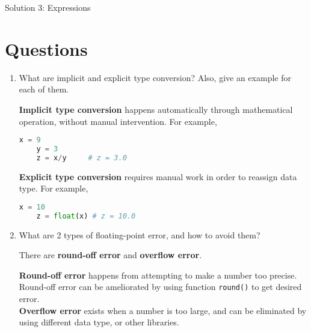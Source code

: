 \documentclass[11pt]{article}
\begin{document}
\begin{center}
    \Large{Solution 3: Expressions}
\end{center}

\section*{Questions}

\begin{enumerate}
    \item {
        What are implicit and explicit type conversion? Also, give an example for each of them.
        \begin{tcolorbox}[colback=black!10!white, colframe=black!75!white, title=\textbf{Answer}]
            
            \textbf{Implicit type conversion} happens automatically through mathematical operation, without manual intervention.
            For example, 

    \begin{lstlisting}[language=Python]
    x = 9
    y = 3
    z = x/y     # z = 3.0 
    \end{lstlisting}    
    
        \textbf{Explicit type conversion} requires manual work in order to reassign data type.
            For example, 

    \begin{lstlisting}[language=Python]
    x = 10
    z = float(x) # z = 10.0
    \end{lstlisting}    
            
        \end{tcolorbox}
    }
    \item {
        What are 2 types of floating-point error, and how to avoid them?
        \begin{tcolorbox}[colback=black!10!white, colframe=black!75!white, title=\textbf{Answer}]
            There are \textbf{round-off error} and \textbf{overflow error}.\\
            \par
            \textbf{Round-off error} happens from attempting to make a number too precise. Round-off error can be ameliorated by using function \texttt{round()} to get desired error.\\
            \textbf{Overflow error} exists when a number is too large, and can be eliminated by using different data type, or other libraries.\\


\end{tcolorbox}}
\end{enumerate}
\end{document}
